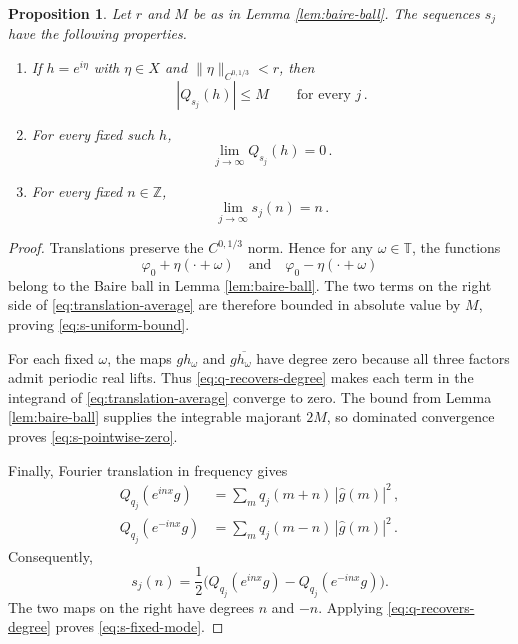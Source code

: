 \documentclass[11pt]{amsart}
\newtheorem{proposition}[theorem]{Proposition}
\theoremstyle{definition}
\theoremstyle{remark}
\newcommand{\T}{\mathbb T}
\newcommand{\Z}{\mathbb Z}
\newcommand{\wh}{\widehat}
\begin{document}
\begin{proposition}\label{prop:s-properties}
Let $r$ and $M$ be as in Lemma \ref{lem:baire-ball}. The sequences $s_j$ have the following properties.
\begin{enumerate}[label=\textup{(\roman*)}]
\item If $h=e^{i\eta}$ with $\eta\in X$ and $\|\eta\|_{C^{0,1/3}}<r$, then
\begin{equation}\label{eq:s-uniform-bound}
 |Q_{s_j}(h)|\leq M
 \qquad\text{for every }j \,.
\end{equation}
\item For every fixed such $h$,
\begin{equation}\label{eq:s-pointwise-zero}
 \lim_{j\to\infty} Q_{s_j}(h)=0 \,.
\end{equation}
\item For every fixed $n\in\Z$,
\begin{equation}\label{eq:s-fixed-mode}
 \lim_{j\to\infty} s_j(n) = n \,.
\end{equation}
\end{enumerate}
\end{proposition}

\begin{proof}
Translations preserve the $C^{0,1/3}$ norm.  Hence for any $\omega\in\T$, the functions
\[
 \varphi_0+\eta(\cdot+\omega)
 \quad\text{and}\quad
 \varphi_0-\eta(\cdot+\omega)
\]
belong to the Baire ball in Lemma \ref{lem:baire-ball}.  The two terms on the right side of \eqref{eq:translation-average} are therefore bounded in absolute value by $M$, proving \eqref{eq:s-uniform-bound}.

For each fixed $\omega$, the maps $gh_\omega$ and $g\overline{h_\omega}$ have degree zero because all three factors admit periodic real lifts.  Thus \eqref{eq:q-recovers-degree} makes each term in the integrand of \eqref{eq:translation-average} converge to zero.  The bound from Lemma \ref{lem:baire-ball} supplies the integrable majorant $2M$, so dominated convergence proves \eqref{eq:s-pointwise-zero}.

Finally, Fourier translation in frequency gives
\begin{align*}
 Q_{q_j}(e^{inx}g)&=\sum_mq_j(m+n) \, |\wh g(m)|^2 \,,\\
 Q_{q_j}(e^{-inx}g)&=\sum_mq_j(m-n) \, |\wh g(m)|^2 \,.
\end{align*}
Consequently,
\begin{equation}\label{eq:s-degree-difference}
 s_j(n)=\frac12\big(Q_{q_j}(e^{inx}g)-Q_{q_j}(e^{-inx}g)\big).
\end{equation}
The two maps on the right have degrees $n$ and $-n$.  Applying \eqref{eq:q-recovers-degree} proves \eqref{eq:s-fixed-mode}.
\end{proof}
\end{document}
